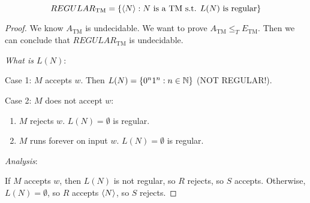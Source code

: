 \begin{equation*}
    REGULAR_{\text{TM}} = \left \{ \left \langle N \right \rangle : N \text{ is a TM s.t. } L(N) \text{ is regular} \right \}
\end{equation*}

\begin{proof}
    We know $A_{\text{TM}}$ is undecidable. We want to prove $A_{\text{TM}} \leq_{T} E_{\text{TM}}$. Then we can conclude that $REGULAR_{\text{TM}}$ is undecidable.

    \emph{What is $L(N)$}:

    Case 1: $M$ accepts $w$. Then $L(N) = \left \{ 0^n1^n : n \in \mathbb{N} \right \}$ (NOT REGULAR!).

    Case 2: $M$ does not accept $w$:

    \begin{enumerate}[2a.]
        \item $M$ rejects $w$. $L(N) = \emptyset$ is regular.
        \item $M$ runs forever on input $w$. $L(N) = \emptyset$ is regular.
    \end{enumerate}

    \emph{Analysis}:

    If $M$ accepts $w$, then $L(N)$ is not regular, so $R$ rejects, so $S$ accepts. Otherwise, $L(N) = \emptyset$, so $R$ accepts $\left \langle N \right \rangle$, so $S$ rejects.
\end{proof}

